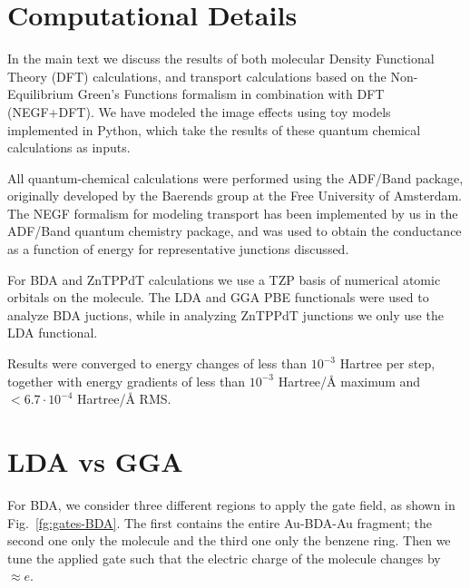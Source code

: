 \documentclass[aip,jcp,a4paper,reprint,floatfix,superscriptaddress]{revtex4-1}
\begin{document}





\clearpage
\appendix



\section{Computational Details}\label{computational_methods}

In the main text we discuss the results of both molecular Density Functional Theory (DFT) calculations, and transport calculations based on the Non-Equilibrium Green's Functions formalism in combination with DFT (NEGF+DFT).\cite{Meir1992,Datta2000} We have modeled the image effects using toy models implemented in Python, which take the results of these quantum chemical calculations as inputs.

All quantum-chemical calculations were performed using the ADF/Band package,\cite{Velde1991,Wiesenekker1991,Verzijl2012} originally developed by the Baerends group at the Free University of Amsterdam. The NEGF formalism for modeling transport has been implemented by us in the ADF/Band quantum chemistry package,\cite{Verzijl2012} and was used to obtain the conductance as a function of energy for representative junctions discussed. 

For BDA and ZnTPPdT calculations we use a TZP basis of numerical atomic orbitals on the molecule. The LDA and GGA PBE functionals were used to analyze BDA juctions, while in analyzing ZnTPPdT junctions we only use the LDA functional.

Results were converged to energy changes of less than $10^{-3}$ Hartree per step, together with energy gradients of less than $10^{-3}$ Hartree/\AA\xspace maximum and $<6.7\cdot 10^{-4}$ Hartree/\AA\xspace RMS.





\section{LDA vs GGA}\label{LDA-vs-GGA}

For BDA, we consider three different regions to apply the gate field, as shown in Fig.~\ref{fg:gates-BDA}. The first contains the entire Au-BDA-Au fragment; the second one only the molecule and the third one only the benzene ring. Then we tune the applied gate such that the electric charge of the molecule changes by $\approx e$. 
\end{document}
